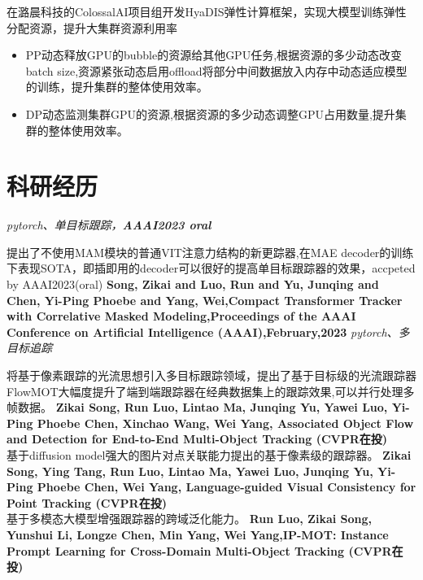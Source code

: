\documentclass{uniquecv}
\begin{document}
在潞晨科技的ColossalAI项目组开发HyaDIS弹性计算框架，实现大模型训练弹性分配资源，提升大集群资源利用率
\begin{itemize}
  \item PP动态释放GPU的bubble的资源给其他GPU任务,根据资源的多少动态改变batch size,资源紧张动态启用offload将部分中间数据放入内存中动态适应模型的训练，提升集群的整体使用效率。
 \item DP动态监测集群GPU的资源,根据资源的多少动态调整GPU占用数量,提升集群的整体使用效率。
\end{itemize}

\section{科研经历}
\textit{pytorch、单目标跟踪，\textbf{AAAI2023 oral}}
\vspace{0.4ex}

提出了不使用MAM模块的普通VIT注意力结构的新更踪器,在MAE decoder的训练下表现SOTA，即插即用的decoder可以很好的提高单目标跟踪器的效果，accpeted by AAAI2023(oral) 
\textbf{Song, Zikai and Luo, Run and Yu, Junqing and Chen, Yi-Ping Phoebe and Yang, Wei,Compact Transformer Tracker with Correlative Masked Modeling,Proceedings of the AAAI Conference on Artificial Intelligence (AAAI),February,2023}
\textit{pytorch、多目标追踪}
\vspace{0.4ex}

将基于像素跟踪的光流思想引入多目标跟踪领域，提出了基于目标级的光流跟踪器FlowMOT大幅度提升了端到端跟踪器在经典数据集上的跟踪效果,可以并行处理多帧数据。
\textbf{Zikai Song, Run Luo, Lintao Ma, Junqing Yu, Yawei Luo, Yi-Ping Phoebe Chen, Xinchao Wang, Wei Yang, Associated Object Flow and Detection for End-to-End Multi-Object Tracking (CVPR在投)}
\vspace{0.4ex}
\\
基于diffusion model强大的图片对点关联能力提出的基于像素级的跟踪器。
\textbf{Zikai Song, Ying Tang, Run Luo, Lintao Ma, Yawei Luo, Junqing Yu, Yi-Ping Phoebe Chen, Wei Yang, Language-guided Visual Consistency for Point Tracking (CVPR在投)}
\vspace{0.4ex}
\\
基于多模态大模型增强跟踪器的跨域泛化能力。
\textbf{Run Luo, Zikai Song, Yunshui Li, Longze Chen, Min Yang, Wei Yang,IP-MOT: Instance Prompt Learning for Cross-Domain Multi-Object Tracking (CVPR在投)}
\vspace{0.4ex}
\\
\end{document}
